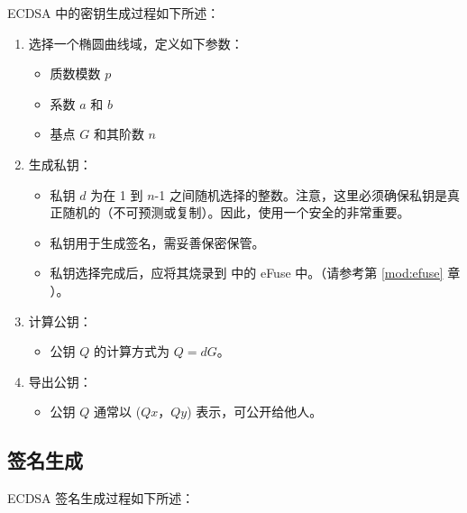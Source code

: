 \documentclass[main\_\_CN.tex]{subfiles}
\begin{document}
ECDSA 中的密钥生成过程如下所述：
\begin{enumerate}
    \item 选择一个椭圆曲线域，定义如下参数：
    \begin{itemize}
        \item 质数模数 $p$
        \item 系数 $a$ 和 $b$
        \item 基点 $G$ 和其阶数 $n$
    \end{itemize}
    \item 生成私钥：
    \begin{itemize}
        \item 私钥 $d$ 为在 1 到 $n$-1 之间随机选择的整数。注意，这里必须确保私钥是真正随机的（不可预测或复制）。因此，使用一个安全的\textit{}非常重要。
        \item 私钥用于生成签名，需妥善保密保管。
        \item 私钥选择完成后，应将其烧录到 \chipname{} 中的 eFuse 中。（请参考第 \ref{mod:efuse} 章 \textit{}）。
    \end{itemize}
    \item 计算公钥：
    \begin{itemize}
        \item 公钥 $Q$ 的计算方式为 $Q = dG$。
    \end{itemize}
    \item 导出公钥：
    \begin{itemize}
        \item 公钥 $Q$ 通常以 ($Qx$，$Qy$) 表示，可公开给他人。
    \end{itemize}
\end{enumerate}

\subsection{签名生成}

ECDSA 签名生成过程如下所述：
\end{document}
